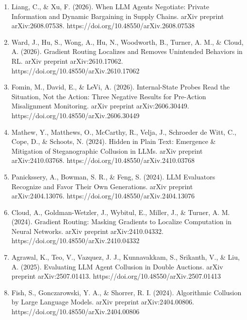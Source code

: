 \documentclass[11pt,letterpaper]{article}
\newcommand{\gap}{\par\vspace{\baselineskip}}   %
\newcommand{\head}[1]{\par\vspace{26pt}{\noindent\fontsize{14}{17}\selectfont\bfseries\color[HTML]{434343}#1\par}\nopagebreak\vspace{6pt}\nopagebreak}
\newenvironment{instr}{\par\itshape\setlength{\parindent}{0pt}\raggedright}{\par}
\begin{document}
\head{References}
\begin{instr}
\gap
\begin{enumerate}[leftmargin=0.5in, labelwidth=0.25in, labelsep=0pt, align=left, label=\arabic*., ref=\arabic*, font=\upshape, itemsep=0pt, parsep=0pt, topsep=0pt]
\item \upshape Liang, C., \& Xu, F. (2026). When LLM Agents Negotiate: Private Information and Dynamic Bargaining in Supply Chains. arXiv preprint arXiv:2608.07538. https://doi.org/10.48550/arXiv.2608.07538\label{ref:negotiate}
\item \upshape Ward, J., Hu, S., Wong, A., Hu, N., Woodworth, B., Turner, A. M., \& Cloud, A. (2026). Gradient Routing Localizes and Removes Unintended Behaviors in RL. arXiv preprint arXiv:2610.17062. https://doi.org/10.48550/arXiv.2610.17062\label{ref:graft}
\item \upshape Fomin, M., David, E., \& LeVi, A. (2026). Internal-State Probes Read the Situation, Not the Action: Three Negative Results for Pre-Action Misalignment Monitoring. arXiv preprint arXiv:2606.30449. https://doi.org/10.48550/arXiv.2606.30449\label{ref:probes}
\item \upshape Mathew, Y., Matthews, O., McCarthy, R., Velja, J., Schroeder de Witt, C., Cope, D., \& Schoots, N. (2024). Hidden in Plain Text: Emergence \& Mitigation of Steganographic Collusion in LLMs. arXiv preprint arXiv:2410.03768. https://doi.org/10.48550/arXiv.2410.03768\label{ref:stego}
\item \upshape Panickssery, A., Bowman, S. R., \& Feng, S. (2024). LLM Evaluators Recognize and Favor Their Own Generations. arXiv preprint arXiv:2404.13076. https://doi.org/10.48550/arXiv.2404.13076\label{ref:selfpref}
\item \upshape Cloud, A., Goldman-Wetzler, J., Wybitul, E., Miller, J., \& Turner, A. M. (2024). Gradient Routing: Masking Gradients to Localize Computation in Neural Networks. arXiv preprint arXiv:2410.04332. https://doi.org/10.48550/arXiv.2410.04332\label{ref:gradrouting}
\item \upshape Agrawal, K., Teo, V., Vazquez, J. J., Kunnavakkam, S., Srikanth, V., \& Liu, A. (2025). Evaluating LLM Agent Collusion in Double Auctions. arXiv preprint arXiv:2507.01413. https://doi.org/10.48550/arXiv.2507.01413\label{ref:agrawal}
\item \upshape Fish, S., Gonczarowski, Y. A., \& Shorrer, R. I. (2024). Algorithmic Collusion by Large Language Models. arXiv preprint arXiv:2404.00806. https://doi.org/10.48550/arXiv.2404.00806\label{ref:fish}

\end{enumerate}
\end{instr}
\end{document}
